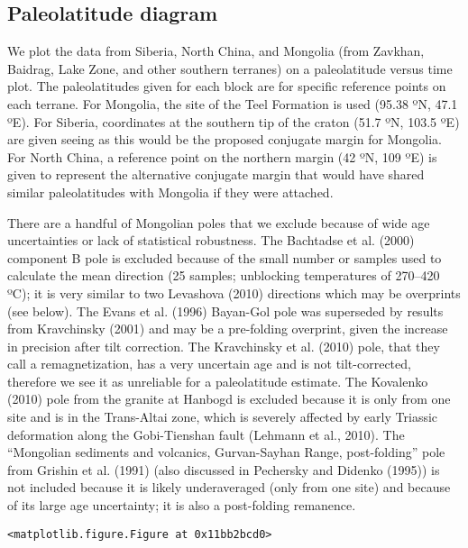 \documentclass[11pt]{article}
\begin{document}
    \subsection{Paleolatitude diagram}\label{paleolatitude-diagram}

    We plot the data from Siberia, North China, and Mongolia (from Zavkhan,
Baidrag, Lake Zone, and other southern terranes) on a paleolatitude
versus time plot. The paleolatitudes given for each block are for
specific reference points on each terrane. For Mongolia, the site of the
Teel Formation is used (95.38 ºN, 47.1 ºE). For Siberia, coordinates at
the southern tip of the craton (51.7 ºN, 103.5 ºE) are given seeing as
this would be the proposed conjugate margin for Mongolia. For North
China, a reference point on the northern margin (42 ºN, 109 ºE) is given
to represent the alternative conjugate margin that would have shared
similar paleolatitudes with Mongolia if they were attached.

    There are a handful of Mongolian poles that we exclude because of wide
age uncertainties or lack of statistical robustness. The Bachtadse et
al. (2000) component B pole is excluded because of the small number or
samples used to calculate the mean direction (25 samples; unblocking
temperatures of 270--420 ºC); it is very similar to two Levashova (2010)
directions which may be overprints (see below). The Evans et al. (1996)
Bayan-Gol pole was superseded by results from Kravchinsky (2001) and may
be a pre-folding overprint, given the increase in precision after tilt
correction. The Kravchinsky et al. (2010) pole, that they call a
remagnetization, has a very uncertain age and is not tilt-corrected,
therefore we see it as unreliable for a paleolatitude estimate. The
Kovalenko (2010) pole from the granite at Hanbogd is excluded because it
is only from one site and is in the Trans-Altai zone, which is severely
affected by early Triassic deformation along the Gobi-Tienshan fault
(Lehmann et al., 2010). The ``Mongolian sediments and volcanics,
Gurvan-Sayhan Range, post-folding'' pole from Grishin et al. (1991)
(also discussed in Pechersky and Didenko (1995)) is not included because
it is likely underaveraged (only from one site) and because of its large
age uncertainty; it is also a post-folding remanence.


    
    \begin{verbatim}
<matplotlib.figure.Figure at 0x11bb2bcd0>
    \end{verbatim}
\end{document}
